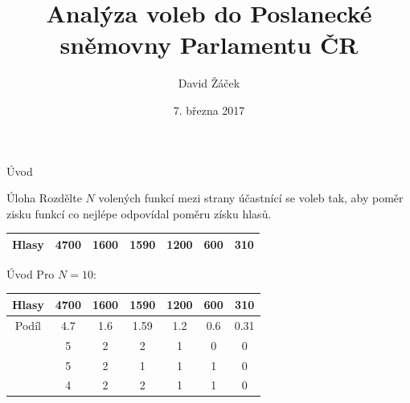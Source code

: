 \documentclass[17pt]{beamer}
\author{David Žáček}
\title[Volby do PSP ČR]{Analýza voleb do Poslanecké sněmovny Parlamentu ČR}
\institute{8.M}
\date{7. března 2017}
\begin{document}
\begin{frame}
\titlepage
\end{frame}


\begin{frame}{Úvod}
\center
\begin{block}{Úloha}
Rozdělte $N$ volených funkcí mezi strany účastnící se voleb tak, aby poměr zisku funkcí co nejlépe odpovídal poměru získu hlasů.
\end{block}
\bigskip
\begin{center}
\begin{tabular}{|c|c|c|c|c|c|c|}
\hline
Hlasy & 4700 & 1600 & 1590 & 1200 & 600 & 310  \\ \hline
\end{tabular}
\end{center}
\end{frame}

\begin{frame}{Úvod}
\center
Pro $N=10$:
\bigskip
\begin{center}
\begin{tabular}{|c|c|c|c|c|c|c|}
\hline
Hlasy & 4700 & 1600 & 1590 & 1200 & 600 & 310  \\ \hline
Podíl & 4.7  & 1.6  & 1.59 & 1.2  & 0.6 & 0.31 \\ \hline
      & 5    & 2    & 2    & 1    & 0   & 0    \\ \hline
      & 5    & 2    & 1    & 1    & 1   & 0    \\ \hline
      & 4    & 2    & 2    & 1    & 1   & 0    \\ \hline
\end{tabular}
\end{center}
\end{frame}
\end{document}
